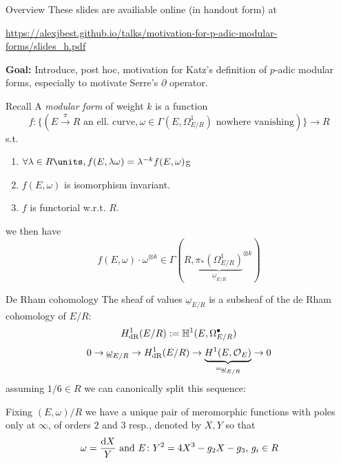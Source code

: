 \begin{frame}
  \titlepage

\end{frame}


\begin{frame}{Overview}
    These slides are availiable online (in handout form) at

    \begin{centering}
        \url{https://alexjbest.github.io/talks/motivation-for-p-adic-modular-forms/slides_h.pdf}
    \end{centering} \pause

    \textbf{Goal:} Introduce, post hoc, motivation for Katz's definition of $p$-adic modular forms, especially to motivate Serre's $\partial$ operator.

\end{frame}

\begin{frame}{Recall}
    A \emph{modular form} of weight $k$ is a function
    \[f\colon \{(E \xrightarrow \pi R\text{ an ell.\ curve}, \omega\in \Gamma(E, \Omega^1_{E/R})\text{ nowhere vanishing})\}\to R\] \pause
    s.t.
    \begin{enumerate}
        \item \(\forall \lambda\in R\units,  f(E, \lambda \omega) = \lambda ^{-k} f(E, \omega)\)g
        \item \(f(E, \omega)\) is isomorphism invariant.
        \item \(f\) is functorial w.r.t. $R$.
    \end{enumerate} \pause
    we then have
    \[f(E, \omega) \cdot \omega^{\otimes k} \in \Gamma(R, {\underbrace{\pi_*(\Omega^1_{E/R})}_{\underline \omega_{E/R}}}^{\otimes k})\]

\end{frame}

\begin{frame}{De Rham cohomology}
    The sheaf of values $\underline \omega_{E/R}$ is a subsheaf of the de Rham cohomology of $E/R$:
    \[H_{\mathrm{dR}}^1(E/R) := \mathbb H^1(E, \Omega^\bullet_{E/R}) \]
    \[0\to \underline \omega_{E/R} \to H^1_{\mathrm{dR}}(E/R) \to \underbrace{ H^1 (E, \operatorname{\mathcal{O}}_E)}_{=\underline \omega_{E/R}} \to 0\]\pause
    assuming $1/6\in R$ we can canonically split this sequence:\pause

    Fixing $(E, \omega)/R$ we have a unique pair of meromorphic functions with poles only at $\infty$, of orders $2$ and $3$ resp., denoted by $X,Y$ so that
    \[ \omega = \frac{\mathop{}\!\mathrm{d} X }{Y}\text{ and } E \colon Y^2 = 4X^3  - g_2X - g_3,\,g_i\in R\]
\end{frame}

